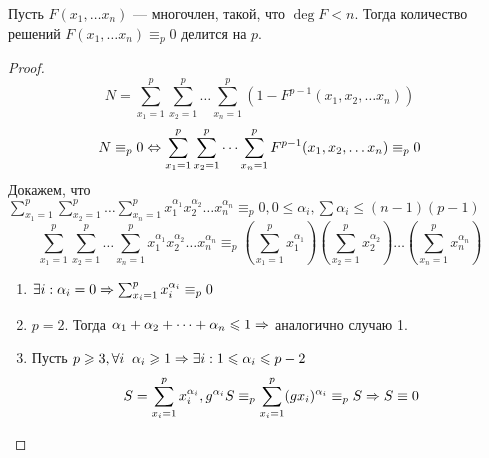 \begin{theorem}[Шевалле]
    Пусть \(F(x_1, \dots x_n)\) --- многочлен, такой, что \(\deg F < n\). Тогда количество решений \(F(x_1, \dots x_n) \equiv_p 0\) делится на \(p\).
\end{theorem}
\begin{proof}
    \[N = \sum_{x_1 = 1}^p\sum_{x_2 = 1}^p\dots \sum_{x_n = 1}^p \left(1 - F^{p - 1}(x_1, x_2, \dots x_n)\right)\]
    \[N \equiv_p 0 \Leftrightarrow \sum_{x_1 = 1}^p\sum_{x_2 = 1}^p\dots \sum_{x_n = 1}^p F^{p - 1}(x_1, x_2, \dots x_n) \equiv_p 0\]
    Докажем, что \(\sum_{x_1 = 1}^p\sum_{x_2 = 1}^p\dots \sum_{x_n = 1}^p x_1^{\alpha_1}x_2^{\alpha_2}\dots x_n^{\alpha_n} \equiv_p 0, 0 \le \alpha_i, \sum \alpha_i \le (n - 1)(p - 1)\)
    \[\sum_{x_1 = 1}^p\sum_{x_2 = 1}^p\dots \sum_{x_n = 1}^p x_1^{\alpha_1}x_2^{\alpha_2}\dots x_n^{\alpha_n} \equiv_p \left(\sum_{x_1 = 1}^p x_1^{\alpha_1}\right)\left(\sum_{x_2 = 1}^p x_2^{\alpha_2}\right)\dots \left(\sum_{x_n = 1}^p x_n^{\alpha_n}\right)\]
    \begin{enumerate}
        \item \(\exists i: \alpha_i = 0 \Rightarrow \sum_{x_i = 1}^p x_i^{\alpha_i} \equiv_p 0\)
        \item \(p = 2\). Тогда \(\alpha_1 + \alpha_2 + \dots + \alpha_n \leqslant 1 \Rightarrow\) аналогично случаю 1.
        \item Пусть \(p \geqslant 3, \forall i\;\;\alpha_i \geqslant 1 \Rightarrow \exists i: 1 \leqslant \alpha_i \leqslant p - 2\)
        \[S = \sum_{x_i = 1}^p x_i^{\alpha_i}, g^{\alpha_i}S \equiv_p \sum_{x_i = 1}^p (gx_i)^{\alpha_i} \equiv_p S \Rightarrow S \equiv 0\]
    \end{enumerate}
\end{proof}